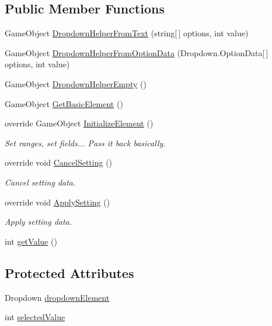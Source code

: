 \subsection*{Public Member Functions}
\begin{DoxyCompactItemize}
\item 
Game\+Object \hyperlink{class_generic_combo_box_a00685a1aa5fb9d5a76864652d80ec557}{Dropdown\+Helper\+From\+Text} (string\mbox{[}$\,$\mbox{]} options, int value)
\item 
Game\+Object \hyperlink{class_generic_combo_box_a2cc0272b4b15b0616938572ce370d741}{Dropdown\+Helper\+From\+Option\+Data} (Dropdown.\+Option\+Data\mbox{[}$\,$\mbox{]} options, int value)
\item 
Game\+Object \hyperlink{class_generic_combo_box_a2dd11da6d2387f7adb28303113ec4c2d}{Dropdown\+Helper\+Empty} ()
\item 
Game\+Object \hyperlink{class_generic_combo_box_a06629d512c45d7080fef30ca4034efea}{Get\+Basic\+Element} ()
\item 
override Game\+Object \hyperlink{class_generic_combo_box_ae1800a7c68d3af046a2b147e117437ff}{Initialize\+Element} ()
\begin{DoxyCompactList}\small\item\em Set ranges, set fields... Pass it back basically. \end{DoxyCompactList}\item 
override void \hyperlink{class_generic_combo_box_a0949a84cf1e33d13346cb90597e005ce}{Cancel\+Setting} ()
\begin{DoxyCompactList}\small\item\em Cancel setting data. \end{DoxyCompactList}\item 
override void \hyperlink{class_generic_combo_box_a5aced71f035bd463a4ebaaffe19ec547}{Apply\+Setting} ()
\begin{DoxyCompactList}\small\item\em Apply setting data. \end{DoxyCompactList}\item 
int \hyperlink{class_generic_combo_box_ae46ddf9be6f30159a56950e3f1184432}{get\+Value} ()
\end{DoxyCompactItemize}
\subsection*{Protected Attributes}
\begin{DoxyCompactItemize}
\item 
Dropdown \hyperlink{class_generic_combo_box_a9bdea08b062f9caecedcfc173197e310}{dropdown\+Element}
\item 
int \hyperlink{class_generic_combo_box_a947c313681c753185d3f6fe4bfa0e896}{selected\+Value}
\end{DoxyCompactItemize}
